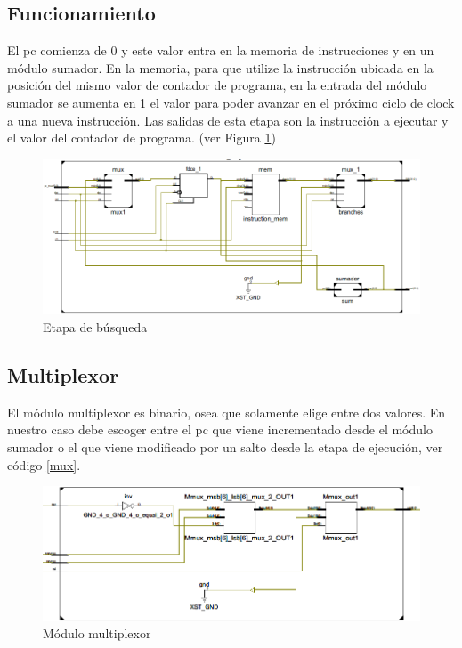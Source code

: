 \subsection{Funcionamiento}
El \ac{pc} comienza de 0 y este valor entra en la memoria de instrucciones y en un m\'odulo sumador. En la memoria, para que utilize la instrucci\'on ubicada en la posici\'on del mismo valor de contador de programa, en la entrada del m\'odulo sumador se aumenta en 1 el valor para poder avanzar en el pr\'oximo ciclo de clock a una nueva instrucci\'on. Las salidas de esta etapa son la instrucci\'on a ejecutar y el valor del contador de programa.  (ver Figura \ref{fig:fetchzoom})

\begin{figure}[H]
\centering
\includegraphics[scale=0.35]{Capitulo01/etapafetchzoom}
\caption{Etapa de búsqueda}
\label{fig:fetchzoom}
\end{figure}

\subsection{Multiplexor}

El módulo multiplexor es binario, osea que solamente elige entre dos valores. En nuestro caso debe escoger entre el \ac{pc} que viene incrementado desde el m\'odulo sumador o el que viene modificado por un salto desde la etapa de ejecución, ver código \ref{mux}. 

\begin{figure}[H]
\centering
\includegraphics[scale=0.4]{Capitulo01/mux_fig.png}
\caption{M\'odulo multiplexor}
\label{fig:muxmodule}
\end{figure}

